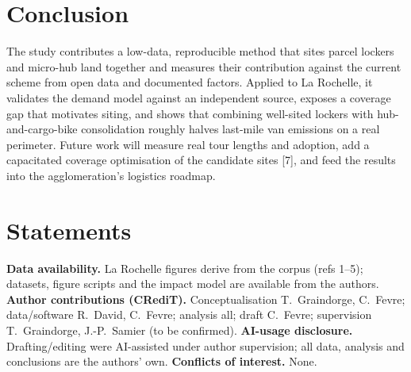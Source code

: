 \documentclass[3p,times]{elsarticle}
\begin{document}
\section{Conclusion}
The study contributes a low-data, reproducible method that sites parcel lockers and
micro-hub land together and measures their contribution against the current scheme
from open data and documented factors. Applied to La Rochelle, it validates the
demand model against an independent source, exposes a coverage gap that motivates
siting, and shows that combining well-sited lockers with hub-and-cargo-bike
consolidation roughly halves last-mile van emissions on a real perimeter. Future
work will measure real tour lengths and adoption, add a capacitated coverage
optimisation of the candidate sites [7], and feed the results into the
agglomeration's logistics roadmap.

\section*{Statements}
\noindent\footnotesize\textbf{Data availability.} La Rochelle figures derive from
the corpus (refs 1--5); datasets, figure scripts and the impact model are available
from the authors. \textbf{Author contributions (CRediT).} Conceptualisation
T.~Graindorge, C.~Fevre; data/software R.~David, C.~Fevre; analysis all; draft
C.~Fevre; supervision T.~Graindorge, J.-P.~Samier (to be confirmed).
\textbf{AI-usage disclosure.} Drafting/editing were AI-assisted under author
supervision; all data, analysis and conclusions are the authors' own.
\textbf{Conflicts of interest.} None.
\normalsize
\end{document}

